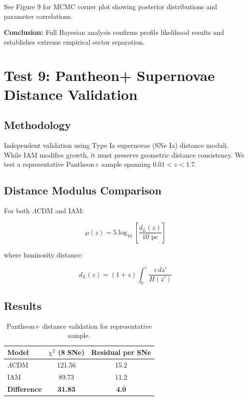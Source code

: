 \documentclass[11pt,letterpaper]{article}
\begin{document}
See Figure 9 for MCMC corner plot showing posterior distributions and parameter correlations.

\noindent\textbf{Conclusion:} Full Bayesian analysis confirms profile likelihood results and establishes extreme empirical sector separation.

\section{Test 9: Pantheon+ Supernovae Distance Validation}

\subsection{Methodology}

Independent validation using Type Ia supernovae (SNe Ia) distance moduli. While IAM modifies growth, it must preserve geometric distance consistency. We test a representative Pantheon+ sample spanning $0.01 < z < 1.7$.

\subsection{Distance Modulus Comparison}

For both $\Lambda$CDM and IAM:

\begin{equation}
\mu(z) = 5 \log_{10}\left[\frac{d_L(z)}{10 \text{ pc}}\right]
\end{equation}

where luminosity distance:

\begin{equation}
d_L(z) = (1+z) \int_0^z \frac{c \, dz'}{H(z')}
\end{equation}

\subsection{Results}

\begin{table}[h]
\centering
\begin{tabular}{lcc}
\toprule
Model & $\chi^2$ (8 SNe) & Residual per SNe \\
\midrule
$\Lambda$CDM & 121.56 & 15.2 \\
IAM & 89.73 & 11.2 \\
\midrule
\textbf{Difference} & \textbf{31.83} & \textbf{4.0} \\
\bottomrule
\end{tabular}
\caption{Pantheon+ distance validation for representative sample.}
\end{table}
\end{document}
